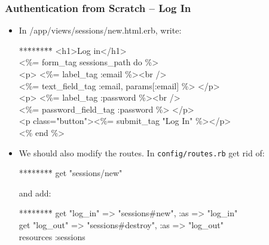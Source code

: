\documentclass[t,handout]{beamer}
\begin{document}
\begin{frame}\frametitle{Authentication from Scratch -- Log In}
\begin{itemize}
 \item In /app/views/sessions/new.html.erb, write:
{\tt\footnotesize \begin{tabbing} **\=**\=**\=**\= \kill
\> <h1>Log in</h1> \\ 
\> <\%= form\_tag sessions\_path do \%> \\
\>\>   <p>  <\%= label\_tag :email \%><br /> \\
\>\>\> \>    <\%= text\_field\_tag :email, params[:email] \%>  </p> \\
\>\>    <p> <\%= label\_tag :password \%><br /> \\
\>\>\> \>     <\%= password\_field\_tag :password \%>  </p> \\
\>\>    <p class="button"><\%= submit\_tag "Log In" \%></p> \\
\> <\% end \%> \\
\end{tabbing}}
\pause
\item We should also modify the routes.  In {\tt config/routes.rb} get rid of: ~\\
{\tt\footnotesize \begin{tabbing} **\=**\=**\=**\= \kill
\> {get "sessions/new"} 
\end{tabbing}}
and add:
{\tt\footnotesize \begin{tabbing} **\=**\=**\=**\= \kill
\> get "log\_in" => "sessions\#new", :as => "log\_in" \\
\> get "log\_out" => "sessions\#destroy", :as => "log\_out" \\
\> resources :sessions
\end{tabbing}}
\end{itemize}
\end{frame} 
\end{document}
